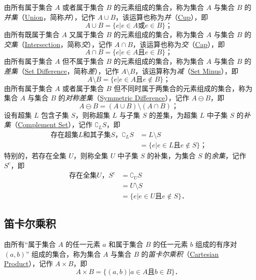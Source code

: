 由所有属于集合 $A$ 或者属于集合 $B$ 的元素组成的集合，称为集合 $A$ 与集合 $B$ 的\emph{并集}（\href{http://mathworld.wolfram.com/Union.html}{Union}，简称\emph{并}），记作 $A\cup{}B$，该运算也称为\emph{并}（\href{http://mathworld.wolfram.com/Cup.html}{Cup}），即
\[
A \cup B = \{ e | e \in A \text{或} e \in B \} \text{；}
\]
由所有既属于集合 $A$ 又属于集合 $B$ 的元素组成的集合，称为集合 $A$ 与集合 $B$ 的\emph{交集}（\href{http://mathworld.wolfram.com/Intersection.html}{Intersection}，简称\emph{交}），记作 $A\cap{}B$，该运算也称为\emph{交}（\href{http://mathworld.wolfram.com/Cap.html}{Cap}），即
\[
A \cap B = \{ e | e \in A \text{且} e \in B \} \text{；}
\]
由所有属于集合 $A$ 但不属于集合 $B$ 的元素组成的集合，称为集合 $A$ 与集合 $B$ 的\emph{差集}（\href{http://mathworld.wolfram.com/SetDifference.html}{Set Difference}，简称\emph{差}），记作 $A\setminus{}B$，该运算称为\emph{减}（\href{http://mathworld.wolfram.com/SetMinus.html}{Set Minus}），即
\[
A \setminus B = \{ e | e \in A \text{且} e \not\in B \} \text{；}
\]
由所有属于集合 $A$ 或者属于集合 $B$ 但不同时属于两集合的元素组成的集合，称为集合 $A$ 与集合 $B$ 的\emph{对称差集}（\href{http://mathworld.wolfram.com/SymmetricDifference.html}{Symmetric Difference}），记作 $A\ominus{}B$，即
\[
A \ominus B = (A \cup B) \setminus (A \cap B) \text{；}
\]
设有超集 $L$ 包含子集 $S$，则称超集 $L$ 与子集 $S$ 的差集，为超集 $L$ 中子集 $S$ 的\emph{补集}（\href{http://mathworld.wolfram.com/ComplementSet.html}{Complement Set}），记作 $\complement_LS$，即
\[
\begin{aligned}
\text{存在超集$L$和其子集$S$，} \complement_LS & = L \setminus S \\
                                     & = \{ e | e \in L \text{且} e \not\in S \} \text{；}
\end{aligned}
\]
特别的，若存在全集 $U$，则称全集 $U$ 中子集 $S$ 的补集，为集合 $S$ 的\emph{余集}，记作 $S^c$，即
\[
\begin{aligned}
\text{存在全集$U$，} S^c &= \complement_US \\
                         &= U \setminus S \\
                         &= \{ e | e \in U \text{且} e \not\in S \} \text{．}
\end{aligned}
\]

\subsection{笛卡尔乘积}

由所有``属于集合 $A$ 的任一元素 $a$ 和属于集合 $B$ 的任一元素 $b$ 组成的有序对 $(a, b)$'' 组成的集合，称为集合 $A$ 与集合 $B$ 的\emph{笛卡尔乘积}（\href{http://mathworld.wolfram.com/CartesianProduct.html}{Cartesian Product}），记作 $A\times{}B$，即
\[
A \times B = \{ (a, b) | a \in A \text{且} b \in B \} \text{．}
\]

